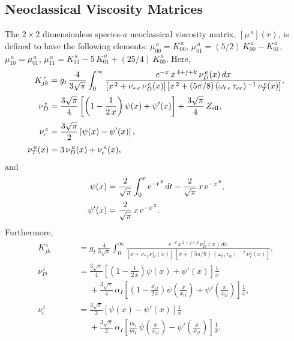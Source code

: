 \documentclass[notitlepage,12pt]{article}
\begin{document}
\subsection{Neoclassical Viscosity Matrices}\label{vmatrix}
The $2\times 2$ dimensionless species-$a$ neoclassical viscosity matrix, $[\mu^{\,a}](r)$,  is defined to have the following elements:
$\mu_{00}^{\,a} = K_{00}^{\,a}$, $\mu_{01}^{\,a}= (5/2)\,K_{00}^{\,a}- K_{01}^{\,a}$,
$\mu_{10}^{\,a}= \mu_{01}^{\,a}$,
$\mu_{11}^{\,a} = K_{11}^{\,a} - 5\,K_{01}^{\,a}+(25/4)\,K_{00}^{\,a}$.
Here,
\begin{align}
 K_{jk}^{\,e} &= g_t\,\frac{4}{3\sqrt{\pi}}\int_0^\infty
\frac{e^{-x}\,x^{\,4+j+k}\,\nu_D^{\,e}(x)\,dx}{[x^{\,2}+\nu_{\ast\,e}\,\nu_D^{\,e}(x)]\,[x^{\,2}+(5\pi/8)\,(\omega_{t\,e}\,\tau_{ee})^{\,-1}\,\nu_T^{\,e}(x)]},\\[0.5ex]
\nu_D^{\,e}&= \frac{3\sqrt{\pi}}{4}\left[\left(1-\frac{1}{2\,x}\right)\psi(x)+\psi'(x)\right]+\frac{3\sqrt{\pi}}{4}\,Z_{\rm eff},\\[0.5ex]
\nu_\epsilon^{\,e}&= \frac{3\sqrt{\pi}}{2}\left[\psi(x)-\psi'(x)\right],\\[0.5ex]
\nu_T^{\,a}(x) &= 3\,\nu_D^{\,a}(x)+\nu_{\epsilon}^{\,a}(x),
\end{align}
and
\begin{align}
\psi(x) &= \frac{2}{\sqrt{\pi}}\int_0^x{\rm e}^{-t^{\,2}}\,dt -\frac{2}{\sqrt{\pi}}\,x\,{\rm e}^{-x^{\,2}},\\[0.5ex]
\psi'(x)&= \frac{2}{\sqrt{\pi}}\,x\,{\rm e}^{-x^{\,2}}.
\end{align}
Furthermore, 
\begin{align}
 K_{jk}^{\,i} &=g_t\,\frac{4}{3\sqrt{\pi}}\int_0^\infty
\frac{e^{-x}\,x^{\,2+j+k}\,\nu_D^{\,i}(x)\,dx}{[x+\nu_{\ast\,i}\,\nu_D^{\,i}(x)]\,[x+(5\pi/8)\,(\omega_{t\,i}\,\tau_{ii})^{\,-1}\,\nu_T^{\,i}(x)]},\\[0.5ex]
 \nu_D^{\,i}&= \frac{3\sqrt{\pi}}{4}\left[\left(1-\frac{1}{2\,x}\right)\psi(x)+\psi'(x)\right]\frac{1}{x}\nonumber\\[0.5ex]\phantom{===}
&\phantom{=}+\frac{3\sqrt{\pi}}{4}\,\alpha_I\left[\left(1-\frac{x_{iI}}{2\,x}\right)\psi\!\left(\frac{x}{x_{iI}}\right)
+\psi'\!\left(\frac{x}{x_{iI}}\right)\right]\frac{1}{x},\\[0.5ex]
 \nu_\epsilon^{\,i}&=\frac{3\sqrt{\pi}}{2}\left[\psi(x)-\psi'(x)\right]\frac{1}{x}\nonumber\\[0.5ex]\phantom{===}
&\phantom{=}+\frac{3\sqrt{\pi}}{2}\,\alpha_I\left[\frac{m_i}{m_I}\,\psi\!\left(\frac{x}{x_{iI}}\right)
-\psi'\!\left(\frac{x}{x_{iI}}\right)\right]\frac{1}{x},
\end{align}
\end{document}
